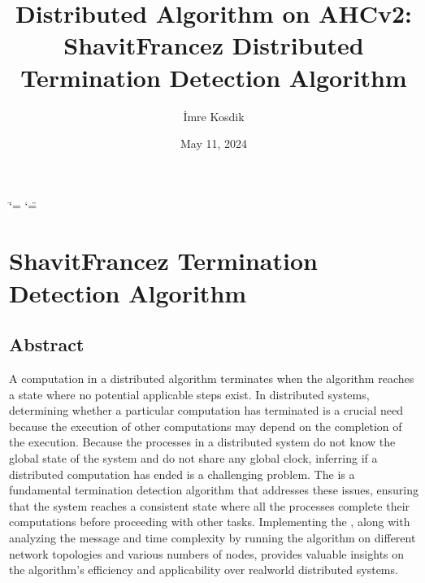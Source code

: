 \documentclass[letterpaper,10pt,english]{sphinxmanual}
\title{Distributed Algorithm on AHCv2: Shavit\sphinxhyphen{}Francez Distributed Termination Detection Algorithm}
\date{May 11, 2024}
\author{İmre Kosdik}
\begin{document}
\ifdefined\shorthandoff
  \ifnum\catcode`\=\string=\active\shorthandoff{=}\fi
  \ifnum\catcode`\"=\active{}\fi
\fi

\pagestyle{empty}
\sphinxmaketitle
\pagestyle{plain}
\sphinxtableofcontents
\pagestyle{normal}
\label{\detokenize{index::doc}}


\sphinxstepscope


\chapter{Shavit\sphinxhyphen{}Francez Termination Detection Algorithm}
\label{\detokenize{docs/ShavitFrancez/ShavitFrancez:shavitfrancezalg}}\label{\detokenize{docs/ShavitFrancez/ShavitFrancez::doc}}
\sphinxstepscope


\section{Abstract}
\label{\detokenize{docs/ShavitFrancez/abstract:abstract}}\label{\detokenize{docs/ShavitFrancez/abstract::doc}}
\sphinxAtStartPar
A computation in a distributed algorithm terminates when the algorithm reaches a state where no potential applicable steps exist. In distributed systems, determining whether a particular computation has terminated is a crucial need because the execution of other computations may depend on the completion of the execution. Because the processes in a distributed system do not know the global state of the system and do not share any global clock, inferring if a distributed computation has ended is a challenging problem. The {\hyperref[\detokenize{docs/ShavitFrancez/algorithm:shavitfrancezterminationdetectionalgorithm}]{}} is a fundamental termination detection algorithm that addresses these issues, ensuring that the system reaches a consistent state where all the processes complete their computations before proceeding with other tasks. Implementing the {\hyperref[\detokenize{docs/ShavitFrancez/algorithm:shavitfrancezterminationdetectionalgorithm}]{}}, along with analyzing the message and time complexity by running the algorithm on different network topologies and various numbers of nodes, provides valuable insights on the algorithm’s efficiency and applicability over real\sphinxhyphen{}world distributed systems.

\sphinxstepscope
\end{document}
